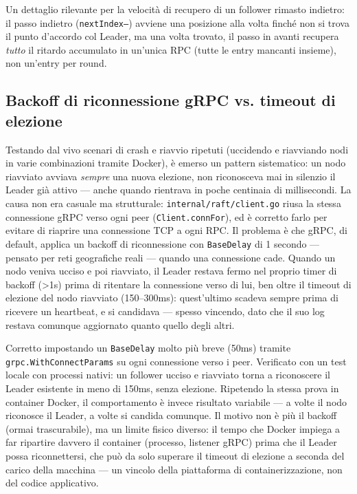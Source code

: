 \documentclass[conference]{IEEEtran}
\begin{document}
Un dettaglio rilevante per la velocità di recupero di un follower rimasto
indietro: il passo indietro (\texttt{nextIndex--}) avviene una posizione
alla volta finché non si trova il punto d'accordo col Leader, ma una volta
trovato, il passo in avanti recupera \emph{tutto} il ritardo accumulato in
un'unica RPC (tutte le entry mancanti insieme), non un'entry per round.

\subsection{Backoff di riconnessione gRPC vs. timeout di elezione}
\label{sec:backoff}

Testando dal vivo scenari di crash e riavvio ripetuti (uccidendo e
riavviando nodi in varie combinazioni tramite Docker), è emerso un pattern
sistematico: un nodo riavviato avviava \emph{sempre} una nuova elezione,
non riconosceva mai in silenzio il Leader già attivo — anche quando
rientrava in poche centinaia di millisecondi. La causa non era casuale ma
strutturale: \texttt{internal/raft/client.go} riusa la stessa connessione
gRPC verso ogni peer (\texttt{Client.connFor}), ed è corretto farlo per
evitare di riaprire una connessione TCP a ogni RPC. Il problema è che gRPC,
di default, applica un backoff di riconnessione con \texttt{BaseDelay} di
1 secondo — pensato per reti geografiche reali — quando una connessione
cade. Quando un nodo veniva ucciso e poi riavviato, il Leader restava
fermo nel proprio timer di backoff (\textgreater{}1s) prima di ritentare
la connessione verso di lui, ben oltre il timeout di elezione del nodo
riavviato (150--300ms): quest'ultimo scadeva sempre prima di ricevere un
heartbeat, e si candidava — spesso vincendo, dato che il suo log restava
comunque aggiornato quanto quello degli altri.

Corretto impostando un \texttt{BaseDelay} molto più breve (50ms) tramite
\texttt{grpc.WithConnectParams} su ogni connessione verso i peer. Verificato
con un test locale con processi nativi: un follower ucciso e riavviato
torna a riconoscere il Leader esistente in meno di 150ms, senza elezione.
Ripetendo la stessa prova in container Docker, il comportamento è invece
risultato variabile — a volte il nodo riconosce il Leader, a volte si
candida comunque. Il motivo non è più il backoff (ormai trascurabile), ma
un limite fisico diverso: il tempo che Docker impiega a far ripartire
davvero il container (processo, listener gRPC) prima che il Leader possa
riconnettersi, che può da solo superare il timeout di elezione a seconda
del carico della macchina — un vincolo della piattaforma di
containerizzazione, non del codice applicativo.
\end{document}
